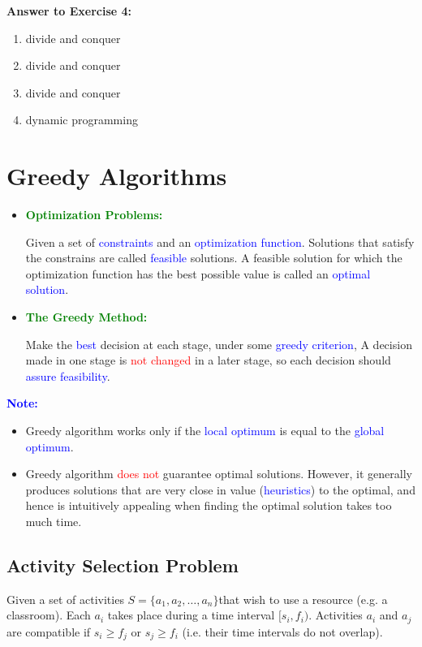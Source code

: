 \documentclass{article}
\begin{document}
\textbf{Answer to Exercise 4:}\par
\begin{enumerate}
    \item divide and conquer
    \item divide and conquer
    \item divide and conquer
    \item dynamic programming
\end{enumerate}

\newpage
\section{Greedy Algorithms}

\begin{itemize}
    \item []\textcolor{green}{\textbf{Optimization Problems:}}\par
    Given a set of \textcolor{blue}{constraints} and an \textcolor{blue}{optimization function}. Solutions that satisfy the constrains are called \textcolor{blue}{feasible} solutions. A feasible solution for which the optimization function has the best possible value is called an \textcolor{blue}{optimal solution}.
    \item []\textcolor{green}{\textbf{The Greedy Method:}}\par
    Make the \textcolor{blue}{best} decision at each stage, under some \textcolor{blue}{greedy criterion}, A decision made in one stage is \textcolor{red}{not changed} in a later stage, so each decision should \textcolor{blue}{assure feasibility}.
\end{itemize}

\textcolor{blue}{\textbf{Note:}}\par
\begin{itemize}
    \item Greedy algorithm works only if the \textcolor{blue}{local optimum} is equal to the \textcolor{blue}{global optimum}.
    \item Greedy algorithm \textcolor{red}{does not} guarantee optimal solutions. However, it generally produces solutions that are very close in value (\textcolor{blue}{heuristics}) to the optimal, and hence is intuitively appealing when finding the optimal solution takes too much time.
\end{itemize}

\subsection{Activity Selection Problem}
Given a set of activities $S = \{ a_1, a_2, \dots, a_n \}$that wish to use a resource (e.g. a classroom).  Each $a_i$ takes place during a time interval $[s_i, f_i)$. Activities $a_i$ and $a_j$ are compatible if $s_i \ge f_j$ or $s_j \ge f_i$ (i.e. their time intervals do not overlap).
\end{document}
